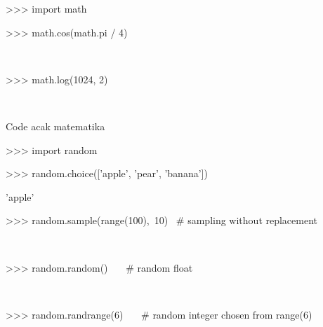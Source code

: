 {\fontsize{14pt}{14pt}\selectfont >>> import math \\} \par
\vspace{14pt}
\noindent 
{\fontsize{14pt}{14pt}\selectfont >>> math.cos(math.pi / 4) \\} \par
\noindent 
{\fontsize{14pt}{14pt} \\} \par
\vspace{14pt}
\noindent 
{\fontsize{14pt}{14pt}\selectfont >>> math.log(1024, 2) \\} \par
\noindent 
{\fontsize{14pt}{14pt} \\} \par
\vspace{14pt}
\noindent 
{\fontsize{14pt}{14pt}\selectfont Code acak matematika \\} \par
\vspace{14pt}
\noindent 
{\fontsize{14pt}{14pt}\selectfont >>> import random \\} \par
\vspace{14pt}
\noindent 
{\fontsize{14pt}{14pt}\selectfont >>> random.choice(['apple', 'pear', 'banana']) \\} \par
\noindent 
{\fontsize{14pt}{14pt}\selectfont 'apple' \\} \par
\vspace{14pt}
\noindent 
{\fontsize{14pt}{14pt}\selectfont >>> random.sample(range(100),~10)~   $  \#  $ sampling without replacement \\} \par
\noindent 
{\fontsize{14pt}{14pt}\selectfont [30, 83, 16, 4, 8, 81, 41, 50, 18, 33] \\} \par
\vspace{14pt}
\noindent 
{\fontsize{14pt}{14pt}\selectfont >>> random.random()~~~  $  \#  $ random float \\} \par
\noindent 
{\fontsize{14pt}{14pt} \\} \par
\vspace{14pt}
\noindent 
{\fontsize{14pt}{14pt}\selectfont >>> random.randrange(6)~~~  $  \#  $ random integer chosen from range(6) \\} \par
